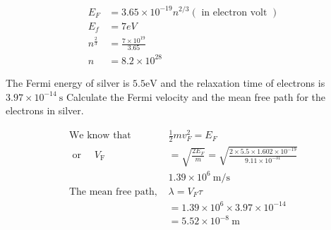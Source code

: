\begin{answer}
	\begin{align*}
	E_{F}&=3.65 \times 10^{-19} n^{2 / 3}(\text { in electron volt }) \\
	E_f&=7eV\\
	n^{\frac{2}{3}}&=\frac{7\times 10^{19}}{3.65}\\
	n&=8.2\times 10^{28}
	\end{align*}
\end{answer}
\begin{exercise}
	 The Fermi energy of silver is  $5.5 \mathrm{eV}$ and the relaxation time of electrons is $3.97 \times 10^{-14} \mathrm{~s}$  Calculate the Fermi velocity and the mean free path for the electrons in silver.
\end{exercise}
\begin{answer}
	\begin{align*}
	\text{We know that }&\frac{1}{2} m v_{F}^{2}=E_{F}\\
\text{	or }\quad V_{\mathrm{F}}&=\sqrt{\frac{2 E_{F}}{m}}=\sqrt{\frac{2 \times 5.5 \times 1.602 \times 10^{-19}}{9.11 \times 10^{-31}}}\\
	&1.39 \times 10^{6} \mathrm{~m} / \mathrm{s}\\
	\text{The mean free path, }&\lambda=V_{F} \tau\\
	&=1.39 \times 10^{6} \times 3.97 \times 10^{-14} \\
	&=5.52 \times 10^{-8} \mathrm{~m}
	\end{align*}
\end{answer}

